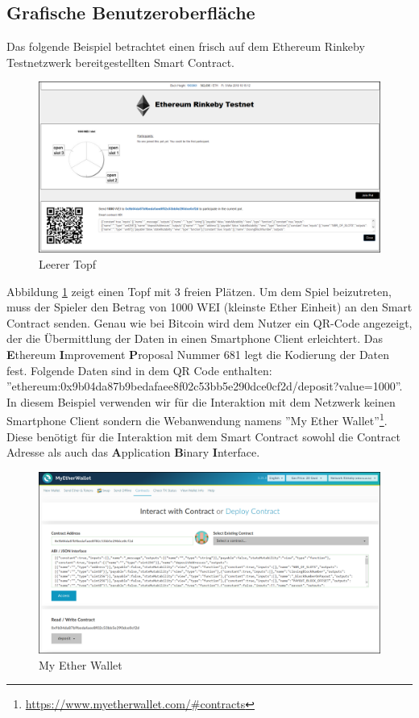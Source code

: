 \subsection{Grafische Benutzeroberfläche}

Das folgende Beispiel betrachtet einen frisch auf dem Ethereum Rinkeby Testnetzwerk bereitgestellten Smart Contract.

\begin{figure}[H]
\centering
\includegraphics[width=1\linewidth]{Figures/eth_gui/ETH_pot_empty}
\decoRule
\caption{Leerer Topf}
\label{fig:ETH_pot_empty}
\end{figure}
Abbildung \ref{fig:ETH_pot_empty} zeigt einen Topf mit 3 freien Plätzen. Um dem Spiel beizutreten, muss der Spieler den Betrag von 1000 WEI (kleinste Ether Einheit) an den Smart Contract senden. Genau wie bei Bitcoin wird dem Nutzer ein QR-Code angezeigt, der die Übermittlung der Daten in einen Smartphone Client erleichtert. Das \textbf{E}thereum \textbf{I}mprovement \textbf{P}roposal Nummer 681\cite{eip21} legt die Kodierung der Daten fest.
Folgende Daten sind in dem QR Code enthalten:\\ ''ethereum:0x9b04da87b9bedafaee8f02c53bb5e290dce0cf2d/deposit?value=1000''. In diesem Beispiel verwenden wir für die Interaktion mit dem Netzwerk keinen Smartphone Client sondern die Webanwendung namens ''My Ether Wallet''\footnote{\url{https://www.myetherwallet.com/\#contracts}}. Diese benötigt für die Interaktion mit dem Smart Contract sowohl die Contract Adresse als auch das \textbf{A}pplication \textbf{B}inary \textbf{I}nterface.


\begin{figure}[H]
\centering
\includegraphics[width=1\linewidth]{Figures/eth_gui/ETH_wallet}
\decoRule
\caption{My Ether Wallet}
\label{fig:ETH_wallet}
\end{figure}

